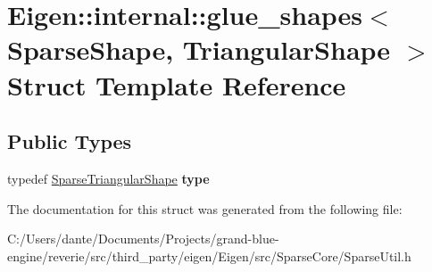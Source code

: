 \hypertarget{struct_eigen_1_1internal_1_1glue__shapes_3_01_sparse_shape_00_01_triangular_shape_01_4}{}\section{Eigen\+::internal\+::glue\+\_\+shapes$<$ Sparse\+Shape, Triangular\+Shape $>$ Struct Template Reference}
\label{struct_eigen_1_1internal_1_1glue__shapes_3_01_sparse_shape_00_01_triangular_shape_01_4}
\subsection*{Public Types}
\begin{DoxyCompactItemize}
\item 
\mbox{\label{struct_eigen_1_1internal_1_1glue__shapes_3_01_sparse_shape_00_01_triangular_shape_01_4_a0d53b8f571c176e561262c760085af26}} 
typedef \mbox{\hyperlink{struct_eigen_1_1internal_1_1_sparse_triangular_shape}{Sparse\+Triangular\+Shape}} {\bfseries type}
\end{DoxyCompactItemize}


The documentation for this struct was generated from the following file\+:\begin{DoxyCompactItemize}
\item 
C\+:/\+Users/dante/\+Documents/\+Projects/grand-\/blue-\/engine/reverie/src/third\+\_\+party/eigen/\+Eigen/src/\+Sparse\+Core/Sparse\+Util.\+h\end{DoxyCompactItemize}
